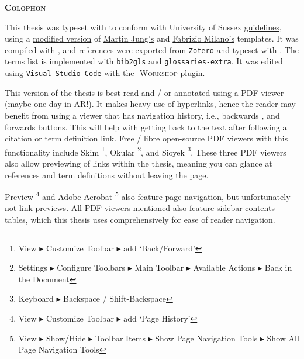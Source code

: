 {}

{}\label{sec: reading}
 \begin{flushleft}
	\Huge \textsc{\textbf{Colophon}}
	
\end{flushleft}
\begin{SingleSpace}
\noindent This thesis was typeset with  to conform with University of Sussex \href{https://www.sussex.ac.uk/rsao/examination}{guidelines}, using a \href{https://github.com/sambilbow/Sussex_PhDThesis}{modified version} of \href{https://github.com/Martin-Jung/Sussex_PhDThesis}{Martin Jung's} and \href{https://github.com/fabriziomiano/phd_thesis}{Fabrizio Milano's} templates. It was compiled with , and references were exported from \verb|Zotero| and typeset with . The terms list is implemented with \verb|bib2gls| and \verb|glossaries-extra|. It was edited using \verb|Visual Studio Code| with the -\scriptsize{\textsc{Workshop}} \normalsize plugin.

\noindent This version of the thesis is best read and / or annotated using a PDF viewer (maybe one day in AR!). It makes heavy use of hyperlinks, hence the reader may benefit from using a viewer that has navigation history, i.e., backwards \faArrowCircleLeft\space, and forwards \faArrowCircleRight\space buttons. This will help with getting back to the text after following a citation or term definition link. Free / libre open-source PDF viewers with this functionality include \href{https://sourceforge.net/projects/skim-app/}{Skim} \faApple\space \footnote{View $\blacktriangleright$ Customize Toolbar $\blacktriangleright$ add `Back/Forward'}, \href{https://okular.kde.org/en-gb/}{Okular} \faLinux \space \faWindows \space \footnote{Settings $\blacktriangleright$ Configure Toolbars  $\blacktriangleright$ Main Toolbar $\blacktriangleright$ Available Actions $\blacktriangleright$ Back in the Document}, and \href{https://sioyek.info/}{Sioyek} \faApple \space \faLinux \space \faWindows \space \footnote{Keyboard $\blacktriangleright$ Backspace / Shift-Backspace}. These three PDF viewers also allow previewing of links within the thesis, meaning you can glance at references and term definitions without leaving the page.

\noindent Preview \faApple\space \footnote{View $\blacktriangleright$ Customize Toolbar $\blacktriangleright$ add `Page History'} and Adobe Acrobat \faApple\space \faLinux \space \faWindows \space \footnote{View $\blacktriangleright$  Show/Hide $\blacktriangleright$ Toolbar Items $\blacktriangleright$ Show Page Navigation Tools $\blacktriangleright$ Show All Page Navigation Tools} also feature page navigation, but unfortunately not link previews. All PDF viewers mentioned also feature sidebar contents tables, which this thesis uses comprehensively for ease of reader navigation.


\end{SingleSpace}
